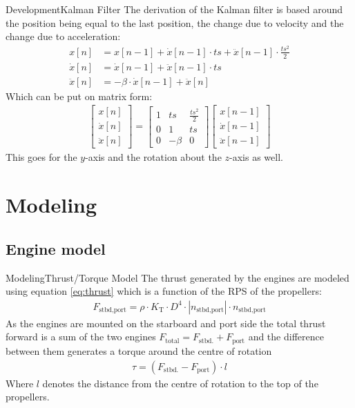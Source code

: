 \documentclass[10pt]{beamer}
\begin{document}
\begin{frame}{Development}{Kalman Filter}
The derivation of the Kalman filter is based around the position being equal to the last position, the change due to velocity and the change due to acceleration:
\begin{align}
x[n] &= x[n-1] + \dot{x}[n-1]\cdot ts + \ddot{x}[n-1]\cdot \frac{ts^2}{2}\\
\dot{x}[n] &= \dot{x}[n-1] + \ddot{x}[n-1] \cdot ts\\
\ddot{x}[n] &= -\beta \cdot \dot{x}[n-1] + \ddot{x}[n]
\end{align}
Which can be put on matrix form:
\begin{align}
\begin{bmatrix}
x[n]\\
\dot{x}[n]\\
\ddot{x}[n]
\end{bmatrix} = \begin{bmatrix}
1 & ts & \frac{ts^2}{2}\\
0 & 1 & ts\\
0 & -\beta & 0
\end{bmatrix}\begin{bmatrix}
x[n-1]\\
\dot{x}[n-1]\\
\ddot{x}[n-1]
\end{bmatrix}
\end{align}
This goes for the $y$-axis and the rotation about the $z$-axis as well.
\end{frame}

\section{Modeling}
\subsection{Engine model}
\begin{frame}{Modeling}{Thrust/Torque Model}
The thrust generated by the engines are modeled using equation \ref{eq:thrust} which is a function of the RPS of the propellers:
\begin{align}
F_\text{stbd,port} = \rho \cdot K_\text{T} \cdot D^4 \cdot |n_\text{stbd,port}| \cdot n_\text{stbd,port}
\label{eq:thrust}
\end{align}
As the engines are mounted on the starboard and port side the total thrust forward is a sum of the two engines $F_\text{total} = F_\text{stbd.} + F_\text{port}$ and the difference between them generates a torque around the centre of rotation
\begin{align}
\tau = (F_\text{stbd.} - F_\text{port}) \cdot l
\end{align}
Where $l$ denotes the distance from the centre of rotation to the top of the propellers.
\end{frame}
\end{document}
